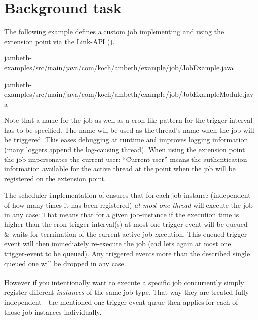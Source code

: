 \section{Background task}
\label{feature:BackgroundTask}
\ClearAPI
The following example defines a custom job implementing  and using the extension point  via the Link-API ().

{jambeth-examples/src/main/java/com/koch/ambeth/example/job/JobExample.java}

{jambeth-examples/src/main/java/com/koch/ambeth/example/job/JobExampleModule.java}

Note that a name for the job as well as a cron-like pattern for the trigger interval has to be specified. The name will be used as the thread's name when the job will be triggered. This eases debugging at runtime and improves logging information (many loggers append the log-causing thread). When using the extension point the job impersonates the current user: ``Current user'' means the authentication information available for the active thread at the point when the job will be registered on the extension point.


The scheduler implementation of \AMBETH{} ensures that for each job instance (independent of how many times it has been registered) \emph{at most one thread} will execute the job in any case: That means that for a given job-instance if the execution time is higher than the cron-trigger interval(s) at most one trigger-event will be queued \& waits for termination of the current active job-execution. This queued trigger-event will then immediately re-execute the job (and lets again at most one trigger-event to be queued). Any triggered events more than the described single queued one will be dropped in any case.\\\\

However if you intentionally want to execute a specific job concurrently simply register different \emph{instances} of the same job type. That way they are treated fully independent - the mentioned one-trigger-event-queue then applies for each of those job instances individually.